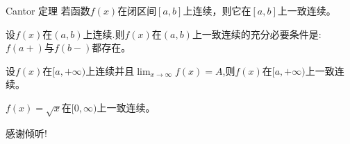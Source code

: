 \documentclass[10pt]{beamer}
\theoremstyle{remark}
\begin{document}
\begin{frame}
  \begin{block}{Cantor 定理}
    若函数$f(x)$在闭区间$[a,b]$上连续，则它在$[a,b]$上一致连续。
  \end{block}
  \begin{example}
    设$f(x)$在$(a,b)$上连续.则$f(x)$在$(a,b)$上一致连续的充分必要条件是:$f(a+)$与$f(b-)$都存在。
  \end{example}  
\begin{example}
  设$f(x)$在$[a,+\infty)$上连续并且$\lim_{x\to\infty} f(x)= A$,则$f(x)$在$[a,+\infty)$上一致连续。
\end{example}
\begin{example}
  $f(x)=\sqrt{x}$在$[0,\infty)$上一致连续。
\end{example}
\end{frame}



%


%

\begin{frame}[standout]
    感谢倾听!
\end{frame} 
\end{document}
